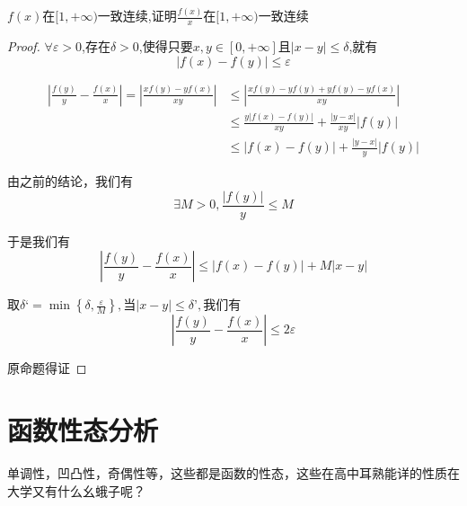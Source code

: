 \documentclass[lang=cn,10pt]{elegantbook}
\begin{document}
	\begin{example}
		$f(x)$在$[1,+\infty)$一致连续,证明$\frac{f(x)}{x}$在$[1,+\infty)$一致连续
	\end{example}
	\begin{proof}
		
			$\forall\varepsilon >0$,存在$\delta>0$,使得只要$x,y\in [0,+\infty]$且$|x-y|\le \delta$,就有
		\begin{equation*}
			|f(x)-f(y)|\le\varepsilon
		\end{equation*}
		
		\begin{equation*}
			\begin{aligned}
				|\frac{f\left( y \right)}{y}-\frac{f\left( x \right)}{x}|=|\frac{xf\left( y \right) -yf\left( x \right)}{xy}|&\le |\frac{xf\left( y \right) -yf\left( y \right) +yf\left( y \right) -yf\left( x \right)}{xy}|
				\\
				&\le \frac{y|f\left( x \right) -f\left( y \right) |}{xy}+\frac{|y-x|}{xy}|f\left( y \right) |
				\\
				&\le |f\left( x \right) -f\left( y \right) |+\frac{|y-x|}{y}|f\left( y \right) |
			\end{aligned}
		\end{equation*}
		
		由之前的结论，我们有
		\begin{equation*}
			\exists M>0,\frac{|f(y)|}{y}\le M
		\end{equation*}
		
		于是我们有
		\begin{equation*}
			|\frac{f\left( y \right)}{y}-\frac{f\left( x \right)}{x}|\le |f\left( x \right) -f\left( y \right) |+M|x-y|
		\end{equation*}
		
		取$\delta‘ =\min \left\{ \delta ,\frac{\varepsilon}{M} \right\} ,\text{当}|x-y|\le \delta’ ,\text{我们有}$
		\begin{equation*}
			|\frac{f\left( y \right)}{y}-\frac{f\left( x \right)}{x}|\le 2\varepsilon
		\end{equation*}
		
		原命题得证
	\end{proof}
	\section{函数性态分析}
	单调性，凹凸性，奇偶性等，这些都是函数的性态，这些在高中耳熟能详的性质在大学又有什么幺蛾子呢？
	
\end{document}
